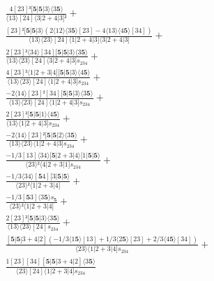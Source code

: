 \documentclass[varwidth, border=5pt]{standalone}
\begin{document}
\begin{my}
$\begin{gathered}
\scriptscriptstyle\frac{4[23]³[𝟓|𝟓|3⟩⟨3𝟓⟩}{⟨13⟩[24]⟨3|2+4|3]²} +\\
\scriptscriptstyle\frac{[23]²[𝟓|𝟓|3⟩(2⟨12⟩⟨3𝟓⟩[23]-4⟨13⟩⟨4𝟓⟩[34])}{⟨13⟩⟨23⟩[24]⟨1|2+4|3]⟨3|2+4|3]} +\\
\scriptscriptstyle\frac{2[23]²⟨34⟩[34][𝟓|𝟓|3⟩⟨3𝟓⟩}{⟨13⟩⟨23⟩[24]⟨3|2+4|3]s_{234}} +\\
\scriptscriptstyle\frac{4[23]²⟨1|2+3|4][𝟓|𝟓|3⟩⟨4𝟓⟩}{⟨13⟩⟨23⟩[24]⟨1|2+4|3]s_{234}} +\\
\scriptscriptstyle\frac{-2⟨14⟩[23]²[34][𝟓|𝟓|3⟩⟨3𝟓⟩}{⟨13⟩⟨23⟩[24]⟨1|2+4|3]s_{234}} +\\
\scriptscriptstyle\frac{2[23]²[𝟓|𝟓|1⟩⟨4𝟓⟩}{⟨13⟩⟨1|2+4|3]s_{234}} +\\
\scriptscriptstyle\frac{-2⟨14⟩[23]²[𝟓|𝟓|2⟩⟨3𝟓⟩}{⟨13⟩⟨23⟩⟨1|2+4|3]s_{234}} +\\
\scriptscriptstyle\frac{-1/3[13]⟨34⟩[𝟓|2+3|4⟩[1|𝟓|𝟓⟩}{⟨23⟩²⟨4|2+3|1]s_{234}} +\\
\scriptscriptstyle\frac{-1/3⟨34⟩[𝟓4][3|𝟓|𝟓⟩}{⟨23⟩²⟨1|2+3|4]} +\\
\scriptscriptstyle\frac{-1/3[𝟓3]⟨3𝟓⟩s_{𝟓}}{⟨23⟩²⟨1|2+3|4]} +\\
\scriptscriptstyle\frac{2[23]²[𝟓|𝟓|3⟩⟨3𝟓⟩}{⟨13⟩⟨23⟩[24]s_{234}} +\\
\scriptscriptstyle\frac{[𝟓|𝟓|3+4|2](-1/3⟨1𝟓⟩[13]+1/3⟨2𝟓⟩[23]+2/3⟨4𝟓⟩[34])}{⟨23⟩⟨1|2+3|4]s_{234}} +\\
\scriptscriptstyle\frac{1[23][34][𝟓|𝟓|3+4|2]⟨3𝟓⟩}{⟨23⟩[24]⟨1|2+3|4]s_{234}} \phantom{+}
\end{gathered}$
\end{my}
\end{document}
